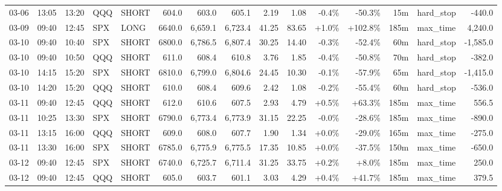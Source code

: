 \documentclass[11pt,a4paper,twoside]{article}
\begin{document}
\begin{landscape}
\begin{center}
\begin{longtable}{>{\color{txtmain}}l l l l l r r r r r r r r >{\color{txtmain}}l r}
03-06 & 13:05 & 13:20 & QQQ & SHORT & 604.0 & 603.0 & 605.1 & 2.19 & 1.08 & \textcolor{lossred}{-0.4\%} & \textcolor{lossred}{-50.3\%} & 15m & hard\_stop & \textcolor{lossred}{-440.0} \\
03-09 & 09:40 & 12:45 & SPX & LONG & 6640.0 & 6,659.1 & 6,723.4 & 41.25 & 83.65 & \textcolor{wingreen}{+1.0\%} & \textcolor{wingreen}{+102.8\%} & 185m & max\_time & \textcolor{wingreen}{4,240.0} \\
03-10 & 09:40 & 10:40 & SPX & SHORT & 6800.0 & 6,786.5 & 6,807.4 & 30.25 & 14.40 & \textcolor{lossred}{-0.3\%} & \textcolor{lossred}{-52.4\%} & 60m & hard\_stop & \textcolor{lossred}{-1,585.0} \\
03-10 & 09:40 & 10:50 & QQQ & SHORT & 611.0 & 608.4 & 610.8 & 3.76 & 1.85 & \textcolor{lossred}{-0.4\%} & \textcolor{lossred}{-50.8\%} & 70m & hard\_stop & \textcolor{lossred}{-382.0} \\
03-10 & 14:15 & 15:20 & SPX & SHORT & 6810.0 & 6,799.0 & 6,804.6 & 24.45 & 10.30 & \textcolor{lossred}{-0.1\%} & \textcolor{lossred}{-57.9\%} & 65m & hard\_stop & \textcolor{lossred}{-1,415.0} \\
03-10 & 14:20 & 15:20 & QQQ & SHORT & 610.0 & 608.4 & 609.6 & 2.42 & 1.08 & \textcolor{lossred}{-0.2\%} & \textcolor{lossred}{-55.4\%} & 60m & hard\_stop & \textcolor{lossred}{-536.0} \\
03-11 & 09:40 & 12:45 & QQQ & SHORT & 612.0 & 610.6 & 607.5 & 2.93 & 4.79 & \textcolor{wingreen}{+0.5\%} & \textcolor{wingreen}{+63.3\%} & 185m & max\_time & \textcolor{wingreen}{556.5} \\
03-11 & 10:25 & 13:30 & SPX & SHORT & 6790.0 & 6,773.4 & 6,773.9 & 31.15 & 22.25 & \textcolor{lossred}{-0.0\%} & \textcolor{lossred}{-28.6\%} & 185m & max\_time & \textcolor{lossred}{-890.0} \\
03-11 & 13:15 & 16:00 & QQQ & SHORT & 609.0 & 608.0 & 607.7 & 1.90 & 1.34 & \textcolor{wingreen}{+0.0\%} & \textcolor{lossred}{-29.0\%} & 165m & max\_time & \textcolor{lossred}{-275.0} \\
03-11 & 13:30 & 16:00 & SPX & SHORT & 6785.0 & 6,775.9 & 6,775.5 & 17.35 & 10.85 & \textcolor{wingreen}{+0.0\%} & \textcolor{lossred}{-37.5\%} & 150m & max\_time & \textcolor{lossred}{-650.0} \\
03-12 & 09:40 & 12:45 & SPX & SHORT & 6740.0 & 6,725.7 & 6,711.4 & 31.25 & 33.75 & \textcolor{wingreen}{+0.2\%} & \textcolor{wingreen}{+8.0\%} & 185m & max\_time & \textcolor{wingreen}{250.0} \\
03-12 & 09:40 & 12:45 & QQQ & SHORT & 605.0 & 603.7 & 601.1 & 3.03 & 4.29 & \textcolor{wingreen}{+0.4\%} & \textcolor{wingreen}{+41.7\%} & 185m & max\_time & \textcolor{wingreen}{379.5} \\

\end{longtable}
\end{center}
\end{landscape}
\end{document}
